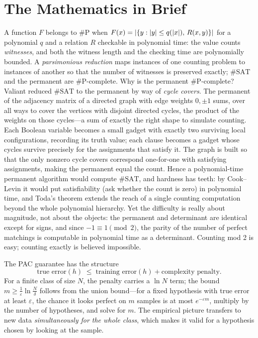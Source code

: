 \section{The Mathematics in Brief}
A function \(F\) belongs to \(\#\mathrm{P}\) when \(F(x)=\left\lvert \{y:\lvert y\rvert\le q(\lvert x\rvert),\,R(x,y)\}\right\rvert\) for a polynomial \(q\) and a relation \(R\) checkable in polynomial time: the value counts \emph{witnesses}, and both the witness length and the checking time are polynomially bounded. A \emph{parsimonious reduction} maps instances of one counting problem to instances of another so that the number of witnesses is preserved exactly; \(\#\mathrm{SAT}\) and the permanent are \(\#\mathrm{P}\)-complete. Why is the permanent \(\#\mathrm{P}\)-complete? Valiant reduced \(\#\mathrm{SAT}\) to the permanent by way of \emph{cycle covers}. The permanent of the adjacency matrix of a directed graph with edge weights \(0,\pm1\) sums, over all ways to cover the vertices with disjoint directed cycles, the product of the weights on those cycles---a sum of exactly the right shape to simulate counting. Each Boolean variable becomes a small gadget with exactly two surviving local configurations, recording its truth value; each clause becomes a gadget whose cycles survive precisely for the assignments that satisfy it. The graph is built so that the only nonzero cycle covers correspond one-for-one with satisfying assignments, making the permanent equal the count. Hence a polynomial-time permanent algorithm would compute \(\#\mathrm{SAT}\), and hardness has teeth: by Cook--Levin it would put satisfiability (ask whether the count is zero) in polynomial time, and Toda's theorem extends the reach of a single counting computation beyond the whole polynomial hierarchy. Yet the difficulty is really about magnitude, not about the objects: the permanent and determinant are identical except for signs, and since \(-1\equiv 1\pmod 2\), the parity of the number of perfect matchings is computable in polynomial time as a determinant. Counting mod 2 is easy; counting exactly is believed impossible.

The PAC guarantee has the structure
\[
\text{true error}(h)\;\le\;\text{training error}(h)+\text{complexity penalty}.
\]
For a finite class of size \(N\), the penalty carries a \(\ln N\) term; the bound \(m\ge\frac1\varepsilon\ln\frac N\delta\) follows from the union bound---for a fixed hypothesis with true error at least \(\varepsilon\), the chance it looks perfect on \(m\) samples is at most \(e^{-\varepsilon m}\), multiply by the number of hypotheses, and solve for \(m\). The empirical picture transfers to new data \emph{simultaneously for the whole class}, which makes it valid for a hypothesis chosen by looking at the sample.

